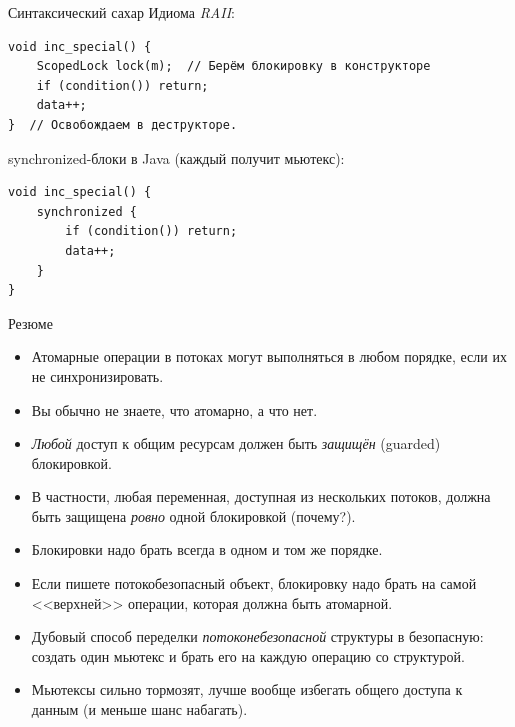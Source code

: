 \begin{frame}[fragile]{Синтаксический сахар}
	Идиома \textit{RAII}:
\begin{verbatim}
void inc_special() {
    ScopedLock lock(m);  // Берём блокировку в конструкторе
    if (condition()) return;
    data++;
}  // Освобождаем в деструкторе.
\end{verbatim}

	synchronized-блоки в Java (каждый получит мьютекс):
\begin{verbatim}
void inc_special() {
    synchronized {
        if (condition()) return;
        data++;
    }
}
\end{verbatim}
\end{frame}

\begin{frame}{Резюме}
	\begin{itemize}
		\item Атомарные операции в потоках могут выполняться в любом порядке, если их не синхронизировать.
		\item Вы обычно не знаете, что атомарно, а что нет.
		\item \textit{Любой} доступ к общим ресурсам должен быть \textit{защищён} (guarded) блокировкой.
		\item В частности, любая переменная, доступная из нескольких потоков, должна быть защищена \textit{ровно} одной блокировкой (почему?).
		\item Блокировки надо брать всегда в одном и том же порядке.
		\item Если пишете потокобезопасный объект, блокировку надо брать на самой <<верхней>> операции, которая должна быть атомарной.
		\item Дубовый способ переделки \textit{потоконебезопасной} структуры в безопасную: создать один мьютекс и брать его на каждую операцию со структурой.
		\item Мьютексы сильно тормозят, лучше вообще избегать общего доступа к данным (и меньше шанс набагать).
	\end{itemize}
\end{frame}
